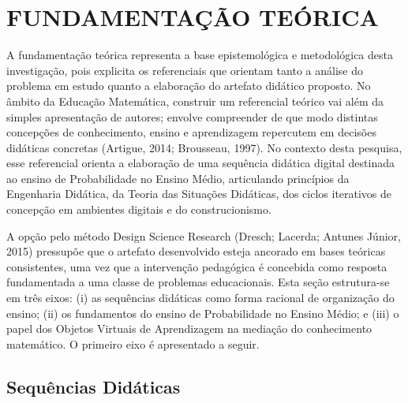 
\chapter{FUNDAMENTAÇÃO TEÓRICA}

{\color{blue} A fundamentação teórica representa a base epistemológica e metodológica desta investigação, pois explicita os referenciais que orientam tanto a análise do problema em estudo quanto a elaboração do artefato didático proposto. No âmbito da Educação Matemática, construir um referencial teórico vai além da simples apresentação de autores; envolve compreender de que modo distintas concepções de conhecimento, ensino e aprendizagem repercutem em decisões didáticas concretas (Artigue, 2014; Brousseau, 1997). No contexto desta pesquisa, esse referencial orienta a elaboração de uma sequência didática digital destinada ao ensino de Probabilidade no Ensino Médio, articulando princípios da Engenharia Didática, da Teoria das Situações Didáticas, dos ciclos iterativos de concepção em ambientes digitais e do construcionismo.

A opção pelo método Design Science Research (Dresch; Lacerda; Antunes Júnior, 2015) pressupõe que o artefato desenvolvido esteja ancorado em bases teóricas consistentes, uma vez que a intervenção pedagógica é concebida como resposta fundamentada a uma classe de problemas educacionais. Esta seção estrutura-se em três eixos: (i) as sequências didáticas como forma racional de organização do ensino; (ii) os fundamentos do ensino de Probabilidade no Ensino Médio; e (iii) o papel dos Objetos Virtuais de Aprendizagem na mediação do conhecimento matemático. O primeiro eixo é apresentado a seguir.

\section{Sequências Didáticas}

}
